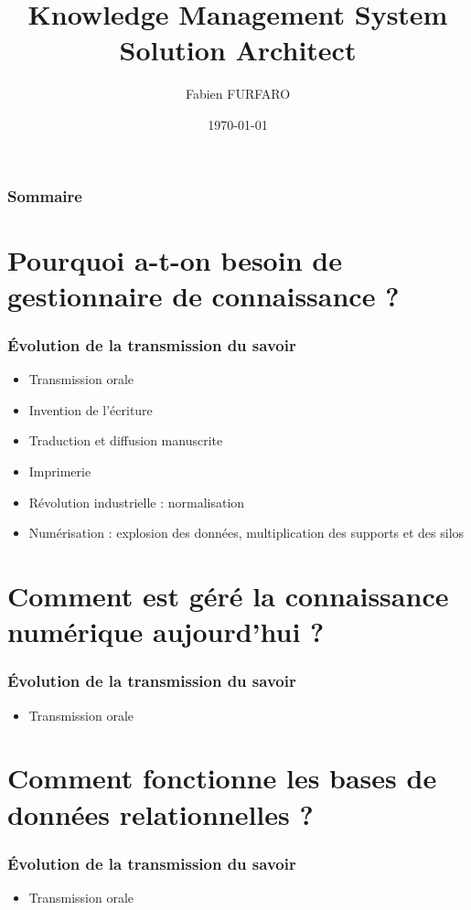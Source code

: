 \documentclass{beamer}
\title{Knowledge Management System\\Solution Architect}
\author{Fabien FURFARO}
\date{\today}
\begin{document}
\frame{\titlepage}

\begin{frame}
  \frametitle{Sommaire}
  \tableofcontents
\end{frame}

\section{Pourquoi a-t-on besoin de gestionnaire de connaissance ?}

\begin{frame}
  \frametitle{Évolution de la transmission du savoir}
  \begin{itemize}
    \item Transmission orale
    \item Invention de l’écriture
    \item Traduction et diffusion manuscrite
    \item Imprimerie
    \item Révolution industrielle : normalisation
    \item Numérisation : explosion des données, multiplication des supports et des silos
  \end{itemize}
\end{frame}

\section{Comment est géré la connaissance numérique aujourd'hui ?}

\begin{frame}
  \frametitle{Évolution de la transmission du savoir}
  \begin{itemize}
    \item Transmission orale
  \end{itemize}
\end{frame}


\section{Comment fonctionne les bases de données relationnelles ?}

\begin{frame}
  \frametitle{Évolution de la transmission du savoir}
  \begin{itemize}
    \item Transmission orale
  \end{itemize}
\end{frame}
\end{document}
